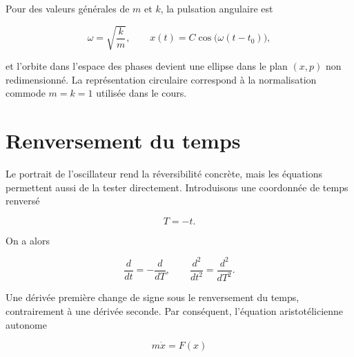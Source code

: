 Pour des valeurs générales de \(m\) et \(k\), la pulsation angulaire est

\begin{equation}
  \omega=\sqrt{\frac{k}{m}},
  \qquad
  x(t)=C\cos\bigl(\omega(t-t_0)\bigr),
  \label{eq:general-oscillator-frequency}
\end{equation}

et l’orbite dans l’espace des phases devient une ellipse dans le plan \((x,p)\) non redimensionné. La représentation circulaire correspond à la normalisation commode \(m=k=1\) utilisée dans le cours.

\begin{classroomqa}\end{classroomqa}

\section{Renversement du temps}

Le portrait de l’oscillateur rend la réversibilité concrète, mais les équations permettent aussi de la tester directement. Introduisons une coordonnée de temps renversé

\begin{equation}
  T=-t.
  \label{eq:reverse-time}
\end{equation}

On a alors

\begin{equation}
  \frac{d}{dt}=-\frac{d}{dT},
  \qquad
  \frac{d^2}{dt^2}=\frac{d^2}{dT^2}.
  \label{eq:time-derivative-parity}
\end{equation}

Une dérivée première change de signe sous le renversement du temps, contrairement à une dérivée seconde. Par conséquent, l’équation aristotélicienne autonome

\begin{equation}
  m\dot x=F(x)
  \label{eq:aristotle-time-reversal}
\end{equation}

